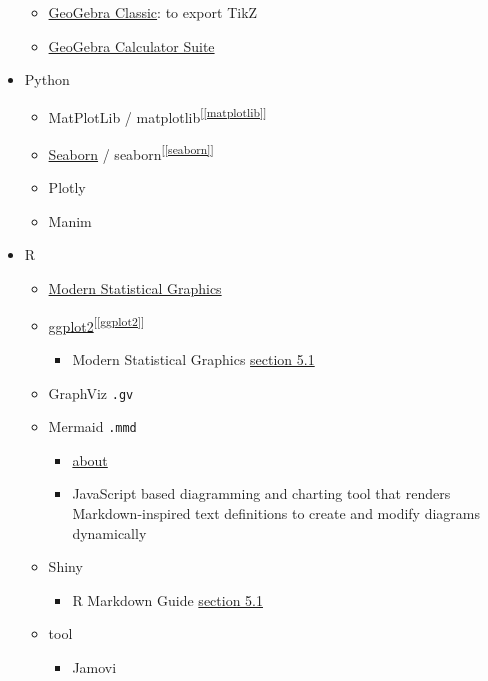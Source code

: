 \documentclass[
]{book}
\providecommand{\tightlist}{%
  \setlength{\itemsep}{0pt}\setlength{\parskip}{0pt}}
\theoremstyle{definition}
\theoremstyle{definition}
\theoremstyle{definition}
\theoremstyle{definition}
\theoremstyle{remark}
\begin{document}
\begin{itemize}
  \begin{itemize}
  \tightlist
  \item
    \href{https://www.geogebra.org/classic}{GeoGebra Classic}: to export TikZ
  \item
    \href{https://www.geogebra.org/calculator}{GeoGebra Calculator Suite}
  \end{itemize}
\item
  Python

  \begin{itemize}
  \tightlist
  \item
    MatPlotLib / matplotlib\textsuperscript{{[}\ref{matplotlib}{]}}
  \item
    \hyperref[seaborn]{Seaborn} / seaborn\textsuperscript{{[}\ref{seaborn}{]}}
  \item
    Plotly
  \item
    Manim
  \end{itemize}
\item
  R

  \begin{itemize}
  \tightlist
  \item
    \href{https://bookdown.org/xiangyun/msg/}{Modern Statistical Graphics}
  \item
    \hyperref[ggplot2]{ggplot2}\textsuperscript{{[}\ref{ggplot2}{]}}

    \begin{itemize}
    \tightlist
    \item
      Modern Statistical Graphics \href{https://bookdown.org/xiangyun/msg/system.html\#sec:ggplot2}{section 5.1}
    \end{itemize}
  \item
    GraphViz \texttt{.gv}
  \item
    Mermaid \texttt{.mmd}

    \begin{itemize}
    \tightlist
    \item
      \href{https://mermaid.js.org/intro/}{about}
    \item
      JavaScript based diagramming and charting tool that renders Markdown-inspired text definitions to create and modify diagrams dynamically
    \end{itemize}
  \item
    Shiny

    \begin{itemize}
    \tightlist
    \item
      R Markdown Guide \href{https://cosname.github.io/rmarkdown-guide/rmarkdown-interaction.html\#rmarkdown-shiny}{section 5.1}
    \end{itemize}
  \item
    tool

    \begin{itemize}
    \tightlist
    \item
      Jamovi
    \end{itemize}
  \end{itemize}
\end{itemize}
\end{document}
